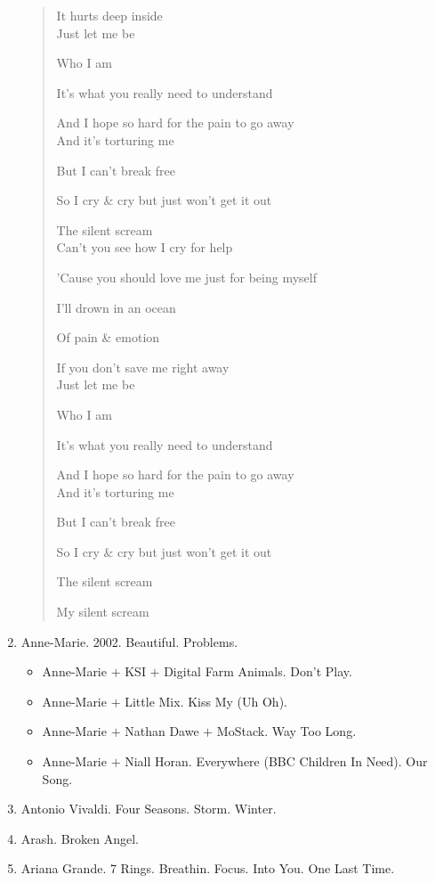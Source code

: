 \documentclass{article}
\begin{document}
\begin{enumerate}
\begin{quotation}
		It hurts deep inside
		\\
		
		Just let me be
		
		Who I am
		
		It's what you really need to understand
		
		And I hope so hard for the pain to go away
		\\
		
		And it's torturing me
		
		But I can't break free
		
		So I cry \& cry but just won't get it out
		
		The silent scream
		\\
		
		Can't you see how I cry for help
		
		'Cause you should love me just for being myself
		
		I'll drown in an ocean
		
		Of pain \& emotion
		
		If you don't save me right away
		\\
		
		Just let me be
		
		Who I am
		
		It's what you really need to understand
		
		And I hope so hard for the pain to go away
		\\
		
		And it's torturing me
		
		But I can't break free
		
		So I cry \& cry but just won't get it out
		
		The silent scream
		
		My silent scream
	\end{quotation}	
	\item {\sc Anne-Marie.} 2002. Beautiful. Problems.
	\begin{itemize}
		\item {\sc Anne-Marie $+$ KSI $+$ Digital Farm Animals.} Don't Play.
		\item {\sc Anne-Marie $+$ Little Mix.} Kiss My (Uh Oh).
		\item {\sc Anne-Marie $+$ Nathan Dawe $+$ MoStack.} Way Too Long.
		\item {\sc Anne-Marie $+$ Niall Horan.} Everywhere (BBC Children In Need). Our Song.
	\end{itemize}
	\item {\sc Antonio Vivaldi.} Four Seasons. Storm. Winter.
	\item {\sc Arash.} Broken Angel.
	\item {\sc Ariana Grande.} 7 Rings. Breathin. Focus. Into You. One Last Time.
	

\end{enumerate}
\end{document}
